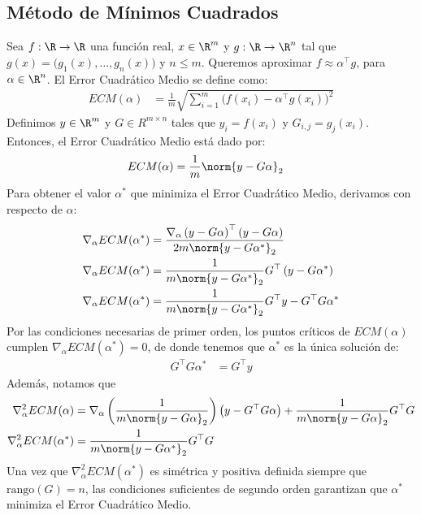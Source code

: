 \subsection{Método de Mínimos Cuadrados}
Sea $f:\R\to \R$ una función real, $x\in\R^{m}$ y $g:\R\to\R^{n}$ tal que $g(x)=\bigl( g_1(x), \ldots, g_n(x) \bigr)$ y $n\leq m$. Queremos aproximar $f\approx \alpha^{\top} g$, para $\alpha \in \R^n$. El Error Cuadrático Medio se define como:
\begin{align*}
ECM(\alpha)&=\frac{1}{m}\sqrt{\sum\limits_{i=1}^m \bigl(f(x_i)- \alpha^{\top}g(x_i)\bigr)^2}
\end{align*}
Definimos $y\in \R^m$ y $G\in R^{m\times n}$ tales que $y_i=f(x_i)$ y $G_{i,j}=g_j(x_i)$. Entonces, el Error Cuadrático Medio está dado por:
\begin{align*}
ECM(\alpha)&=\frac{1}{m}\norm{y-G\alpha}_2
\end{align*}
Para obtener el valor $\alpha^*$ que minimiza el Error Cuadrático Medio, derivamos con respecto de $\alpha$:
\begin{align*}
\nabla_{\alpha} ECM(\alpha^*)&= \frac{\nabla_{\alpha} \left(y-G\alpha\right)^{\top}\left(y-G\alpha\right)}{2m \norm{y-G\alpha^*}_2}\\
\nabla_{\alpha} ECM(\alpha^*)&= \frac{1}{m \norm{y-G\alpha^*}_2}G^{\top}\left(y-G\alpha^*\right)\\
\nabla_{\alpha} ECM(\alpha^*)&= \frac{1}{m \norm{y-G\alpha^*}_2}G^{\top}y-G^{\top}G\alpha^*
\end{align*}
Por las condiciones necesarias de primer orden\cite{Nocedal2006}, los puntos críticos de $ECM(\alpha)$ cumplen $\nabla_\alpha ECM(\alpha^*)=0$, de donde tenemos que $\alpha^*$ es la única solución de:
\begin{align*}
G^{\top}G\alpha^*&=G^{\top}y
\end{align*}
Además, notamos que
\begin{align*}
\nabla_{\alpha}^2 ECM(\alpha)&=\nabla_{\alpha}\left( \frac{1}{m \norm{y-G\alpha}_2}\right) \left(y-G^{\top}G\alpha\right) + \frac{1}{m \norm{y-G\alpha}_2} G^{\top}G\\
\nabla_{\alpha}^2 ECM(\alpha^*)&=\frac{1}{m \norm{y-G\alpha^*}_2} G^{\top}G
\end{align*}
Una vez que $\nabla_{\alpha}^2 ECM(\alpha^*)$ es simétrica y positiva definida siempre que $\mathrm{rango}(G)=n$, las condiciones suficientes de segundo orden garantizan que $\alpha^*$ minimiza el Error Cuadrático Medio.

